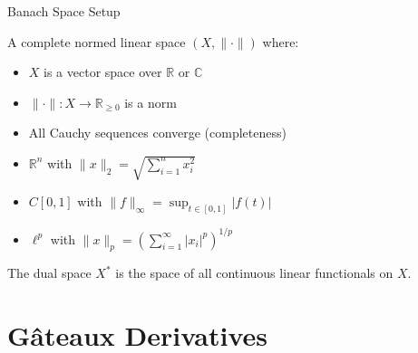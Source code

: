 \documentclass[aspectratio=169,10pt]{beamer}
\begin{document}
\begin{frame}{Banach Space Setup}
  \begin{definition}
    A complete normed linear space $(X, \|\cdot\|)$ where:
    \begin{itemize}
      \item $X$ is a vector space over $\mathbb{R}$ or $\mathbb{C}$
      \item $\|\cdot\|: X \to \mathbb{R}_{\geq 0}$ is a norm
      \item All Cauchy sequences converge (completeness)
    \end{itemize}
  \end{definition}

  \begin{example}
    \begin{itemize}
      \item $\mathbb{R}^n$ with $\|x\|_2 = \sqrt{\sum_{i=1}^n x_i^2}$
      \item $C[0,1]$ with $\|f\|_\infty = \sup_{t \in [0,1]} |f(t)|$
      \item $\ell^p$ with $\|x\|_p = \left(\sum_{i=1}^\infty |x_i|^p\right)^{1/p}$
    \end{itemize}
  \end{example}

  \begin{definition}
    The dual space $X^*$ is the space of all continuous linear functionals on $X$.
  \end{definition}
\end{frame}


\section{Gâteaux Derivatives}
\end{document}
